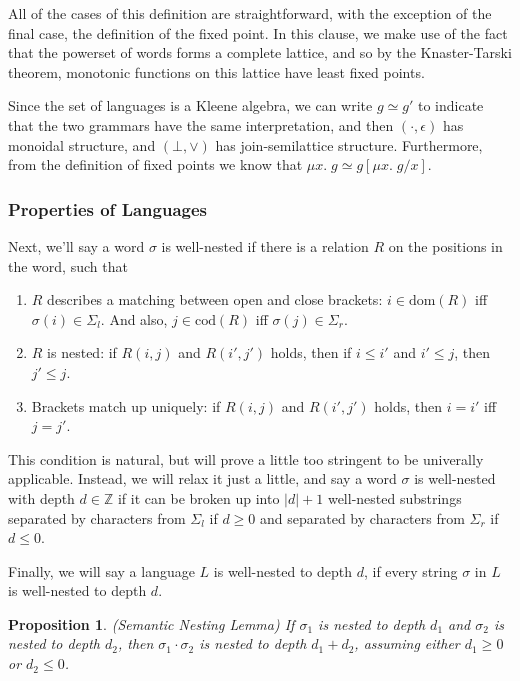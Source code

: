 \documentclass{article}
\newcommand{\fix}[2]{\mu {#1}.\;{#2}}
\newcommand{\ints}{\mathbb{Z}}
\newtheorem{prop}{Proposition}
\begin{document}
All of the cases of this definition are straightforward, with the
exception of the final case, the definition of the fixed point. In
this clause, we make use of the fact that the powerset of words forms
a complete lattice, and so by the Knaster-Tarski theorem, monotonic
functions on this lattice have least fixed points.

Since the set of languages is a Kleene algebra, we can write $g \simeq
g'$ to indicate that the two grammars have the same interpretation,
and then $(\cdot, \epsilon)$ has monoidal structure, and $(\bot,
\vee)$ has join-semilattice structure. Furthermore, from the definition
of fixed points we know that $\fix{x}{g} \simeq g[\fix{x}{g}/x]$. 

\subsubsection{Properties of Languages}

Next, we'll say a word $\sigma$ is well-nested if there is a relation $R$ on the 
positions in the word, such that 

\begin{enumerate}
\item $R$ describes a matching between open and close brackets: 
      $i \in \mathrm{dom}(R)$ iff $\sigma(i) \in \Sigma_l$. And also,
      $j \in \mathrm{cod}(R)$ iff $\sigma(j) \in \Sigma_r$.
\item $R$ is nested: if $R(i, j)$ and $R(i', j')$ holds, then if $i \leq i'$ and $i' \leq j$, then $j' \leq j$. 
\item Brackets match up uniquely: if $R(i, j)$ and $R(i', j')$ holds, then $i = i'$ iff $j = j'$. 
\end{enumerate}

This condition is natural, but will prove a little too stringent to be
univerally applicable. Instead, we will relax it just a little, and
say a word $\sigma$ is well-nested with depth $d \in \ints$ if it can
be broken up into $|d| + 1$ well-nested substrings separated by
characters from $\Sigma_l$ if $d \geq 0$ and separated by characters
from $\Sigma_r$ if $d \leq 0$.

Finally, we will say a language $L$ is well-nested to depth $d$, if every string $\sigma$ 
in $L$ is well-nested to depth $d$. 

\begin{prop}{(Semantic Nesting Lemma)}
If $\sigma_1$ is nested to depth $d_1$ and $\sigma_2$ is nested to depth $d_2$, then 
$\sigma_1\cdot\sigma_2$ is nested to depth $d_1 + d_2$, assuming either $d_1 \geq 0$ or 
$d_2 \leq 0$.  
\end{prop}
\end{document}
